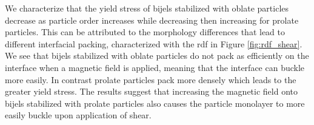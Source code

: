 We characterize that the yield stress of bijels stabilized with oblate particles decrease as particle order increases while decreasing then increasing for 
prolate particles. This can be attributed to the morphology differences that lead to different interfacial packing, characterized with the rdf in Figure 
\ref{fig:rdf_shear}. We see that bijels stabilized with oblate particles do not pack as efficiently on the interface when a magnetic field is applied,
meaning that the interface can buckle more easily. In contrast prolate particles pack more densely which leads to the greater yield stress. The results
suggest that increasing the magnetic field onto bijels stabilized with prolate particles also causes the particle monolayer to more easily buckle 
upon application of shear.